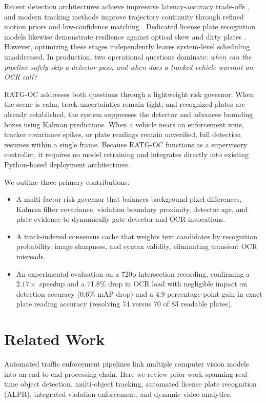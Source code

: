 Recent detection architectures achieve impressive latency-accuracy trade-offs \cite{wang2023yolov7,bie2023yolov5nl,zhao2024rtdetr,wang2024yolov10}, and modern tracking methods improve trajectory continuity through refined motion priors and low-confidence matching \cite{zhang2022bytetrack,cao2023ocsort,zhang2023motrv2,du2023strongsort}. Dedicated license plate recognition models likewise demonstrate resilience against optical skew and dirty plates \cite{shafi2022plate,ke2024trafficmonitoring,wei2024ealpr,lpr2024emission}. However, optimizing these stages independently leaves system-level scheduling unaddressed. In production, two operational questions dominate: \emph{when can the pipeline safely skip a detector pass, and when does a tracked vehicle warrant an OCR call?}

RATG-OC addresses both questions through a lightweight risk governor. When the scene is calm, track uncertainties remain tight, and recognized plates are already established, the system suppresses the detector and advances bounding boxes using Kalman predictions. When a vehicle nears an enforcement zone, tracker covariance spikes, or plate readings remain unverified, full detection resumes within a single frame. Because RATG-OC functions as a supervisory controller, it requires no model retraining and integrates directly into existing Python-based deployment architectures.

We outline three primary contributions:
\begin{itemize}
  \item A multi-factor risk governor that balances background pixel differences, Kalman filter covariance, violation boundary proximity, detector age, and plate evidence to dynamically gate detector and OCR invocations.
  \item A track-indexed consensus cache that weights text candidates by recognition probability, image sharpness, and syntax validity, eliminating transient OCR misreads.
  \item An experimental evaluation on a 720p intersection recording, confirming a $2.17\times$ speedup and a 71.8\% drop in OCR load with negligible impact on detection accuracy ($0.6\%$ mAP drop) and a 4.9 percentage-point gain in exact plate reading accuracy (resolving 74 versus 70 of 83 readable plates).
\end{itemize}

\section{Related Work}
Automated traffic enforcement pipelines link multiple computer vision models into an end-to-end processing chain. Here we review prior work spanning real-time object detection, multi-object tracking, automated license plate recognition (ALPR), integrated violation enforcement, and dynamic video analytics.


